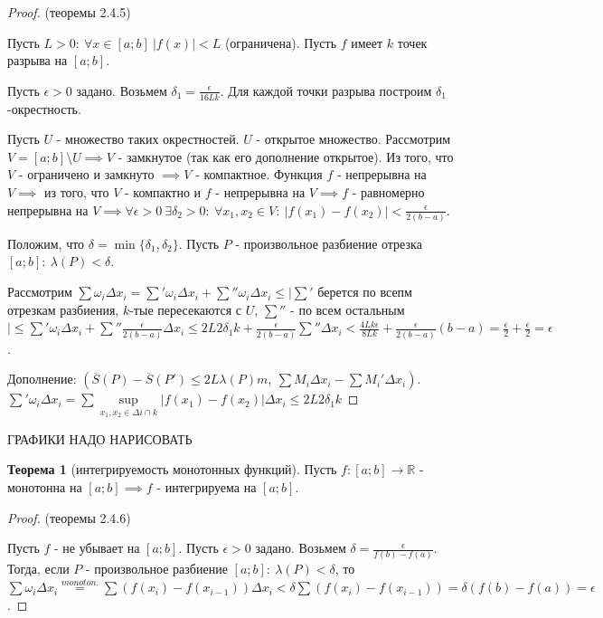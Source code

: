 \documentclass{report}
\theoremstyle{definition}
\newtheorem{theorem}{Теорема}[section]
\begin{document}
\begin{proof}
  (теоремы 2.4.5)

  Пусть $L > 0: \ \forall x \in [a;b] \ | f(x) | < L$ (ограничена). Пусть $f$ имеет $k$ точек
  разрыва на $[a;b]$.

  Пусть $\epsilon > 0$ задано. Возьмем $\delta_{1} = \frac{\epsilon}{16Lk}$. Для каждой точки
  разрыва построим $\delta_{1}$-окрестность.

  Пусть $U$ - множество таких окрестностей. $U$ - открытое множество. Рассмотрим
  $V = [a;b]\setminus U \implies V$ - замкнутое (так как его дополнение открытое). Из того,
  что $V$ - ограничено и замкнуто $\implies V$ - компактное. Функция $f$ - непрерывна на $V
    \implies$ из того, что $V$ - компактно и $f$ - непрерывна на $V \implies f$ - равномерно
  непрерывна на $V\implies \forall\epsilon>0 \ \exists\delta_{2}>0: \ \forall x_{1},x_{2}\in V:
    \ | f(x_{1}) - f(x_{2}) | < \frac{\epsilon}{2(b-a)}$.

  Положим, что $\delta = \min\{\delta_{1},\delta_{2}\}$. Пусть $P$ - произвольное разбиение
  отрезка $[a;b]: \ \lambda(P) < \delta$.

  Рассмотрим $\sum \omega_{i}\Delta x_{i} =  \sum'\omega_{i}\Delta x_{i} + \sum''\omega_{i}
    \Delta x_{i} \leqslant | \sum'$ берется по всепм отрезкам разбиения, $k$-тые пересекаются
  с $U$, $\sum''$ - по всем остальным $| \leqslant \sum'\omega_{i}\Delta x_{i} + \sum''
    \frac{\epsilon}{2(b-a)}\Delta x_{i} \leqslant 2L2\delta_{1}k + \frac{\epsilon}{2(b-a)}\sum''
    \Delta x_{i} < \frac{4Lk\epsilon}{8Lk} + \frac{\epsilon}{2(b-a)}(b-a) = \frac{\epsilon}{2}
    + \frac{\epsilon}{2} = \epsilon$.

  Дополнение: $(\overline{S}(P) - \overline{S}(P') \leqslant
    2L\lambda(P)m, \ \sum M_{i}\Delta x_{i} - \sum M_{i}' \Delta x_{i})$.
  $\sum'\omega_{i}\Delta x_{i} = \sum\underset{x_{1},x_{2}\in\Delta i \cap k}{\sup}
    | f(x_{1}) - f(x_{2}) |\Delta x_{i} \leqslant 2L2\delta_{1}k$

\end{proof}

{\Large ГРАФИКИ НАДО НАРИСОВАТЬ}

\begin{theorem}[интегрируемость монотонных функций]
  Пусть $f:[a;b]\rightarrow\mathbb{R}$ - монотонна на $[a;b]\implies f$ - интегрируема на $[a;b]$.
\end{theorem}

\begin{proof}
  (теоремы 2.4.6)

  Пусть $f$ - не убывает на $[a;b]$. Пусть $\epsilon>0$ задано. Возьмем $\delta = \frac{\epsilon}
    {f(b) - f(a)}$. Тогда, если $P$ - произвольное разбиение $[a;b]: \ \lambda(P)<\delta$, то
  $\sum\omega_{i}\Delta x_{i} \overset{monoton.}{=} \sum (f(x_{i}) - f(x_{i-1}))\Delta x_{i} <
    \delta \sum (f(x_{i}) - f(x_{i-1})) = \delta (f(b) - f(a)) = \epsilon$.
\end{proof}
\end{document}
